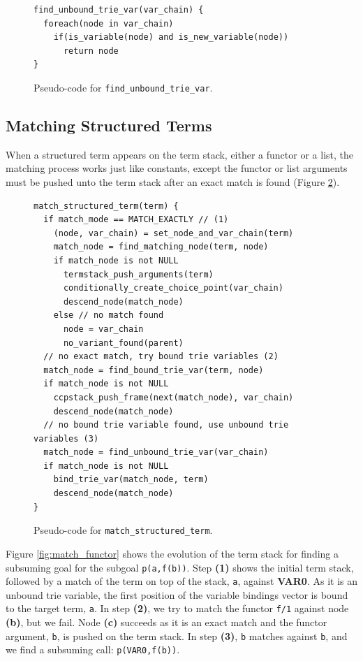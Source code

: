 \begin{figure}[ht]
\begin{Verbatim}
find_unbound_trie_var(var_chain) {
  foreach(node in var_chain)
    if(is_variable(node) and is_new_variable(node))
      return node
}
\end{Verbatim}
\caption{Pseudo-code for \texttt{find\_unbound\_trie\_var}.}
\label{fig:find_unbound_trie_var}
\end{figure}

\subsection{Matching Structured Terms}

When a structured term appears on the term stack, either a functor or a list, the matching process works
just like constants, except the functor or list arguments must be pushed unto the term stack after an exact
match is found (Figure \ref{fig:match_structured_term}).

\begin{figure}[ht]
\begin{Verbatim}
match_structured_term(term) {
  if match_mode == MATCH_EXACTLY // (1)
    (node, var_chain) = set_node_and_var_chain(term)
    match_node = find_matching_node(term, node)
    if match_node is not NULL
      termstack_push_arguments(term)
      conditionally_create_choice_point(var_chain)
      descend_node(match_node)
    else // no match found
      node = var_chain
      no_variant_found(parent)
  // no exact match, try bound trie variables (2)
  match_node = find_bound_trie_var(term, node)
  if match_node is not NULL
    ccpstack_push_frame(next(match_node), var_chain)
    descend_node(match_node)
  // no bound trie variable found, use unbound trie variables (3)
  match_node = find_unbound_trie_var(var_chain)
  if match_node is not NULL
    bind_trie_var(match_node, term)
    descend_node(match_node)
}
\end{Verbatim}
\caption{Pseudo-code for \texttt{match\_structured\_term}.}
\label{fig:match_structured_term}
\end{figure}

Figure \ref{fig:match_functor} shows the evolution of the term stack for finding
a subsuming goal for the subgoal \texttt{p(a,f(b))}. Step \textbf{(1)} shows the initial 
term stack, followed by a match of the term on top of the stack, \texttt{a}, against \textbf{VAR0}.
As it is an unbound trie variable, the first position of the variable bindings vector is
bound to the target term, \texttt{a}.
In step \textbf{(2)}, we try to match the functor \texttt{f/1} against node \textbf{(b)}, but we fail.
Node \textbf{(c)} succeeds as it is an exact match and the functor argument, \texttt{b}, is pushed on
the term stack. In step \textbf{(3)}, \texttt{b} matches against \texttt{b}, and we find a subsuming call:
\texttt{p(VAR0,f(b))}.

